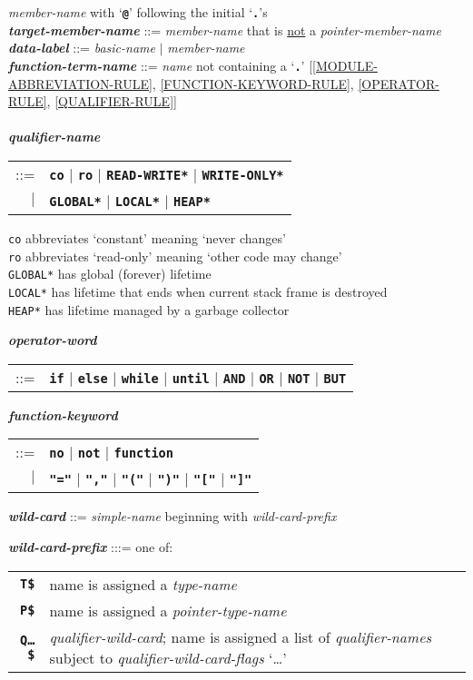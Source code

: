\documentclass[12pt]{article}
\newcommand{\TT}[1]{{\tt \bfseries #1}}
\newcommand{\ttkey}[1]{{\tt \bfseries #1}}
\newcommand{\emkey}[1]{{\em \bfseries #1}}
\newcommand{\ttakey}[1]{{\tt \bfseries *#1*}}
\newenvironment{indpar}[1][0.3in]%
	{\begin{list}{}%
		     {\setlength{\itemsep}{0in}%
		      \setlength{\topsep}{0in}%
		      \setlength{\parsep}{1ex}%
		      \setlength{\labelwidth}{#1}%
		      \setlength{\leftmargin}{#1}%
		      \addtolength{\leftmargin}{\labelsep}}%
	 \item}%
	{\end{list}}
\begin{document}
\begin{indpar}
    {\em member-name} with `\TT{@}' following the initial `\TT{.}'s \\
\emkey{target-member-name}\label{TARGET-MEMBER-NAME} ::=
    {\em member-name} that is \underline{not} a {\em pointer-member-name}
\\[1ex]
\emkey{data-label}\label{DATA-LABEL} ::=
    {\em basic-name} $|$ {\em member-name}
\\[1ex]
\emkey{function-term-name} ::= {\em name} not containing a `\TT{.}'
    \label{FUNCTION-TERM-NAME}
	[\ref{MODULE-ABBREVIATION-RULE},
	 \ref{FUNCTION-KEYWORD-RULE},
	 \ref{OPERATOR-RULE},
	 \ref{QUALIFIER-RULE}] \\
\\[1ex]
\emkey{qualifier-name}\label{QUALIFIER-NAME}
    \begin{tabular}[t]{rl}
    ::= & \ttkey{co} $|$ \ttkey{ro} $|$ \ttakey{READ-WRITE}
                     $|$ \ttakey{WRITE-ONLY} \\
    $|$ & \ttakey{GLOBAL} $|$ \ttakey{LOCAL} $|$ \ttakey{HEAP} \\
    \end{tabular}
\begin{indpar}
{\tt co} abbreviates `constant' meaning `never changes' \\
{\tt ro} abbreviates `read-only' meaning `other code may change' \\
{\tt *GLOBAL*} has global (forever) lifetime \\
{\tt *LOCAL*} has lifetime that ends when current stack frame is destroyed \\
{\tt *HEAP*} has lifetime managed by a garbage collector
\end{indpar}
\emkey{operator-word}
    \begin{tabular}[t]{rl}
    ::= & \TT{if} $|$ \TT{else} $|$ \TT{while} $|$ \TT{until}
                  $|$ \TT{AND} $|$ \TT{OR}
		  $|$ \TT{NOT} $|$ \TT{BUT}
    \end{tabular}

\emkey{function-keyword}
    \begin{tabular}[t]{rl}
    ::= & \TT{no} $|$ \TT{not} $|$ \TT{function} \\
    $|$ & \TT{"="} $|$ \TT{","} $|$ \TT{"("} $|$ \TT{")"} $|$
          \TT{"["} $|$ \TT{"]"}
    \end{tabular}

\emkey{wild-card}\label{WILD-CARD}
    ::= {\em simple-name} beginning with {\em wild-card-prefix}

\emkey{wild-card-prefix}\label{WILD-CARD-PREFIX} :::= one of: \\
\hspace*{0.2in}\begin{tabular}{rp{4in}}
\ttkey{T\$} & name is assigned a {\em type-name} \\
\ttkey{P\$} & name is assigned a {\em pointer-type-name} \\
\ttkey{Q\ldots\$} & {\em qualifier-wild-card}; name is assigned a
                    list of {\em qualifier-names} subject to
		    {\em qualifier-wild-card-flags} `\ldots'\\
\end{tabular}


\end{indpar}
\end{document}
